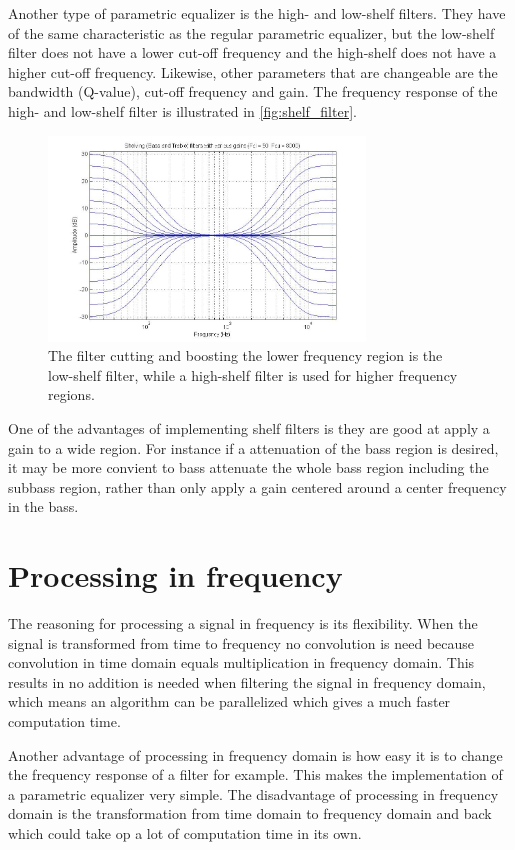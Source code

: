 Another type of parametric equalizer is the high- and low-shelf filters. They have of the same characteristic as the regular parametric equalizer, but the low-shelf filter does not have a lower cut-off frequency and the high-shelf does not have a higher cut-off frequency. Likewise, other parameters that are changeable are the bandwidth (Q-value), cut-off frequency and gain. The frequency response of the high- and low-shelf filter is illustrated in \autoref{fig:shelf_filter}.

\begin{figure}[H]
\centering
\includegraphics[width=0.75\textwidth]{figures/shelf_filter.jpg}
\caption{The filter cutting and boosting the lower frequency region is the low-shelf filter, while a high-shelf filter is used for higher frequency regions.}
\label{fig:shelf_filter}
\end{figure}

One of the advantages of implementing shelf filters is they are good at apply a gain to a wide region. For instance if a attenuation of the bass region is desired, it may be more convient to bass attenuate the whole bass region including the subbass region, rather than only apply a gain centered around a center frequency in the bass.

\section{Processing in frequency}
The reasoning for processing a signal in frequency is its flexibility. When the signal is transformed from time to frequency no convolution is need because convolution in time domain equals multiplication in frequency domain. This results in no addition is needed when filtering the signal in frequency domain, which means an algorithm can be parallelized which gives a much faster computation time. 

Another advantage of processing in frequency domain is how easy it is to change the frequency response of a filter for example. This makes the implementation of a parametric equalizer very simple. The disadvantage of processing in frequency domain is the transformation from time domain to frequency domain and back which could take op a lot of computation time in its own. 

